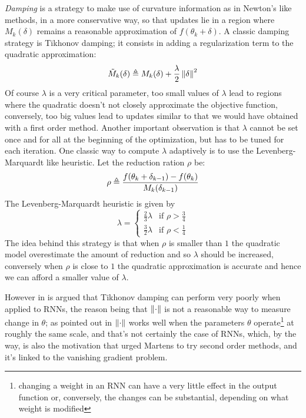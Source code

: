 \textit{Damping} is a strategy to make use of curvature information as in Newton's like methods, in a more conservative way, so that updates lie in a region where $M_k(\delta)$ remains a reasonable approximation of $f(\theta_k+\delta)$. 
A classic damping strategy is Tikhonov damping; it consists in adding a regularization term to the quadratic approximation:
\begin{equation}
 \tilde{M}_k(\delta) \triangleq  M_k(\delta) + \frac{\lambda}{2} \left\Vert \delta \right\Vert^2
\end{equation}
Of course $\lambda$ is a very critical parameter, too small values of $\lambda$ lead to regions where the quadratic doesn't not closely approximate the objective function, conversely, too big values lead to updates similar to that we would have obtained with a first order method. Another important observation is that $\lambda$ cannot be set once and for all at the beginning of the optimization, but has to be tuned for each iteration. One classic way to compute $\lambda$ adaptively is to use the Levenberg-Marquardt like heuristic.
Let the reduction ration $\rho$ be:
\begin{equation}
 \rho \triangleq \frac{f(\theta_k + \delta_{k-1})-f(\theta_k)}{M_k(\delta_{k-1})}
\end{equation}
The Levenberg-Marquardt  heuristic is given by
\begin{equation} 
 \lambda = 
 \begin{cases} 
    \frac{2}{3}\lambda &\mbox{if } \rho > \frac{3}{4} \\ 
    \frac{3}{2}\lambda &\mbox{if } \rho < \frac{1}{4} 
  \end{cases} 
\end{equation}
The idea behind this strategy is that when $\rho$ is smaller than $1$ the quadratic model overestimate the amount of reduction and so $\lambda$ should be increased, conversely when $\rho$ is close to $1$ the quadratic approximation is accurate and hence we can afford a smaller value of $\lambda$.

However in \cite{hessianFree} is argued that Tikhonov damping can perform very poorly when applied to RNNs, the reason being that $\left\Vert \cdot \right\Vert$ is not a reasonable way to measure change in $\theta$; as pointed out in \cite{hessianFree} $\left\Vert \cdot \right\Vert$ works well when the parameters $\theta$ operate\footnote{changing a weight in an RNN can have a very little effect in the output function or, conversely, the changes can be substantial, depending on what weight is modified} at roughly the same scale, and that's not certainly the case of RNNs, which, by the way, is also the motivation that urged Martens to try second order methods, and it's linked to the vanishing gradient problem. 

